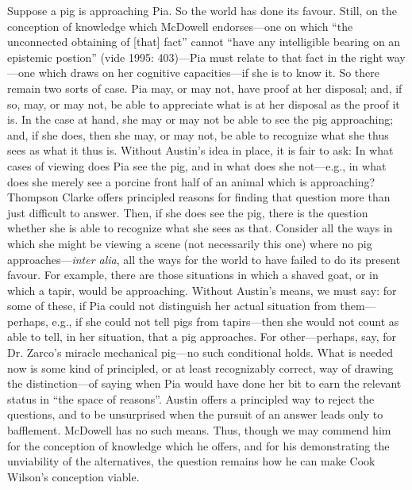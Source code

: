 Suppose a pig is approaching Pia. So the world has done its favour. Still, on the conception of knowledge which McDowell endorses---one on which ``the unconnected obtaining of [that] fact'' cannot ``have any intelligible bearing on an epistemic postion'' (vide 1995: 403)---Pia must relate to that fact in the right way---one which draws on her cognitive capacities---if she is to know it. So there remain two sorts of case. Pia may, or may not, have proof at her disposal; and, if so, may, or may not, be able to appreciate what is at her disposal as the proof it is. In the case at hand, she may or may not be able to see the pig approaching; and, if she does, then she may, or may not, be able to recognize what she thus sees as what it thus is. Without Austin's idea in place, it is fair to ask: In what cases of viewing does Pia see the pig, and in what does she not---e.g., in what does she merely see a porcine front half of an animal which is approaching? Thompson Clarke \citeyearpar{Clarke:1965yg} offers principled reasons for finding that question more than just difficult to answer. Then, if she does see the pig, there is the question whether she is able to recognize what she sees as that. Consider all the ways in which she might be viewing a scene (not necessarily this one) where no pig approaches---\emph{inter alia}, all the ways for the world to have failed to do its present favour. For example, there are those situations in which a shaved goat, or in which a tapir, would be approaching. Without Austin's means, we must say: for some of these, if Pia could not distinguish her actual situation from them---perhaps, e.g., if she could not tell pigs from tapirs---then she would not count as able to tell, in her situation, that a pig approaches. For other---perhaps, say, for Dr. Zarco's miracle mechanical pig---no such conditional holds. What is needed now is some kind of principled, or at least recognizably correct, way of drawing the distinction---of saying when Pia would have done her bit to earn the relevant status in ``the space of reasons''. Austin offers a principled way to reject the questions, and to be unsurprised when the pursuit of an answer leads only to bafflement. McDowell has no such means. Thus, though we may commend him for the conception of knowledge which he offers, and for his demonstrating the unviability of the alternatives, the question remains how he can make Cook Wilson's conception viable.

